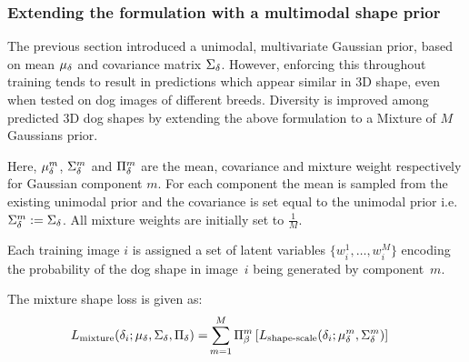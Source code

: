 
\subsubsection{Extending the formulation with a multimodal shape prior}

\def\imgweight{w}

The previous section introduced a unimodal, multivariate Gaussian prior, based on mean $\mu_{\delta}$ and covariance matrix $\Sigma_{\delta}$. However, enforcing this throughout training tends to result in predictions which appear similar in 3D shape, even when tested on dog images of different breeds. Diversity is improved among predicted 3D dog shapes by extending the above formulation to a Mixture of $M$ Gaussians prior.

Here, $\mu_{\delta}^{m}$, $\Sigma_{\delta}^{m}$ and $\Pi_{\delta}^{m}$ are the mean, covariance and mixture weight respectively for Gaussian component 
$m$. For each component the mean is sampled from the existing unimodal prior and the covariance is set equal to the unimodal prior i.e. $\Sigma_{\delta}^{m} := \Sigma_{\delta}$. All mixture weights are initially set to $\frac{1}{M}$.

Each training image $i$ is assigned a set of latent variables $\{\imgweight_{i}^{1}, \dots, \imgweight_{i}^{M}\}$ encoding the probability of the dog shape in image~$i$ being generated by component~$m$. 

The mixture shape loss is given as:
\begin{align}
    L_{\textrm{mixture}}(\delta_{i}; \mu_{\delta}, \Sigma_{\delta}, \Pi_{\delta})
    =&
    \sum_{m=1}^M \Pi_{\beta}^{m} \left[L_{\textrm{shape-scale}}(\delta_{i}; \mu_{\delta}^{m}, \Sigma_{\delta}^{m})\right]
\end{align}





